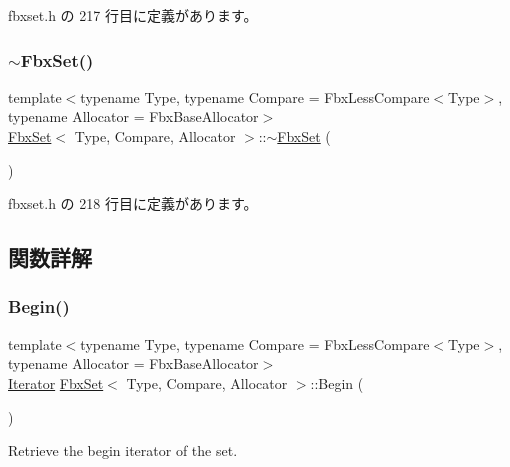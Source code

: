  fbxset.\+h の 217 行目に定義があります。

\mbox{\label{class_fbx_set_ace2b54de05237b1ad7223cb51a8f319a}} 
\subsubsection{\texorpdfstring{$\sim$\+Fbx\+Set()}{~FbxSet()}}
{\footnotesize\ttfamily template$<$typename Type, typename Compare = Fbx\+Less\+Compare$<$\+Type$>$, typename Allocator = Fbx\+Base\+Allocator$>$ \\
\hyperlink{class_fbx_set}{Fbx\+Set}$<$ Type, Compare, Allocator $>$\+::$\sim$\hyperlink{class_fbx_set}{Fbx\+Set} (\begin{DoxyParamCaption}{ }\end{DoxyParamCaption})\hspace{0.3cm}{\ttfamily [inline]}}



 fbxset.\+h の 218 行目に定義があります。



\subsection{関数詳解}
\mbox{\label{class_fbx_set_a77e36a10cf4707bce192e1b6fb8dd404}} 
\subsubsection{\texorpdfstring{Begin()}{Begin()}\hspace{0.1cm}{\footnotesize\ttfamily [1/2]}}
{\footnotesize\ttfamily template$<$typename Type, typename Compare = Fbx\+Less\+Compare$<$\+Type$>$, typename Allocator = Fbx\+Base\+Allocator$>$ \\
\hyperlink{class_fbx_set_ad1b543e0f63f04f4d2dc8e9e3da9bcaa}{Iterator} \hyperlink{class_fbx_set}{Fbx\+Set}$<$ Type, Compare, Allocator $>$\+::Begin (\begin{DoxyParamCaption}{ }\end{DoxyParamCaption})\hspace{0.3cm}{\ttfamily [inline]}}



Retrieve the begin iterator of the set. 



